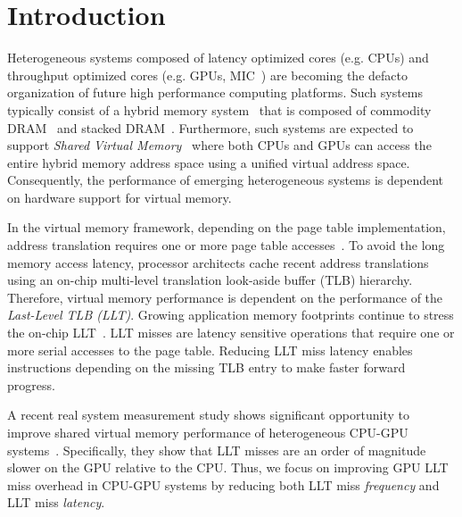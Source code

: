 
\section{Introduction}

\noindent Heterogeneous systems composed of latency optimized cores
(e.g. CPUs) and throughput optimized cores (e.g. GPUs, MIC~\cite{MIC})
are becoming the defacto organization of future high performance
computing platforms. Such systems typically consist of a hybrid memory
system~\cite{hbm_intel,hbm_amd,hbm_nvidia} that is composed of
commodity DRAM~\cite{ddr4-spec} and stacked
DRAM~\cite{hbm-spec,hmc_spec}. Furthermore, such systems are expected
to support {\em Shared Virtual Memory}~\cite{HSA,UVM} where both CPUs
and GPUs can access the entire hybrid memory address space using a
unified virtual address space. Consequently, the performance of
emerging heterogeneous systems is dependent on hardware support for
virtual memory.

In the virtual memory framework, depending on the page table
implementation, address translation requires one or more page table
accesses~\cite{Bhargava2008}. To avoid the long memory access latency,
processor architects cache recent address translations using an
on-chip multi-level translation look-aside buffer (TLB) hierarchy.
Therefore, virtual memory performance is dependent on the performance
of the {\em Last-Level TLB (LLT)}. Growing application memory
footprints continue to stress the on-chip LLT~\cite{spectlb, Basu2013,
SharedLLT, COLT}. LLT misses are latency sensitive operations that
require one or more serial accesses to the page table. Reducing LLT
miss latency enables instructions depending on the missing TLB entry
to make faster forward progress.

A recent real system measurement study shows significant opportunity
to improve shared virtual memory performance of heterogeneous CPU-GPU
systems~\cite{vesley2016ispass}. Specifically, they show that LLT
misses are an order of magnitude slower on the GPU relative to the
CPU. Thus, we focus on improving GPU LLT miss overhead in CPU-GPU
systems by reducing both LLT miss {\em frequency} and LLT miss {\em
latency}.



